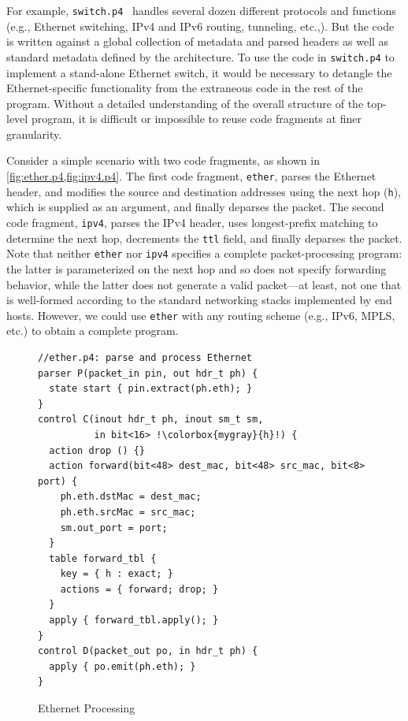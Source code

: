 \documentclass[letterpaper,twocolumn,10pt]{article}
\begin{document}
For example, \texttt{switch.p4}~\cite{switch.p4} handles several dozen
different protocols and functions (e.g., Ethernet switching, IPv4 and
IPv6 routing, tunneling, etc.,). But the code is written against a
global collection of metadata and parsed headers as well as standard
metadata defined by the architecture. To use the code in
\texttt{switch.p4} to implement a stand-alone Ethernet switch, it
would be necessary to detangle the Ethernet-specific functionality
from the extraneous code in the rest of the program. Without a
detailed understanding of the overall structure of the top-level
program, it is difficult or impossible to reuse code fragments at
finer granularity.

Consider a simple scenario with two code fragments, as shown in
\cref{fig:ether.p4,fig:ipv4.p4}. The first code fragment,
\texttt{ether}, parses the Ethernet header, and modifies the source
and destination addresses using the next hop (\texttt{h}), which is
supplied as an argument, and finally deparses the packet. The second
code fragment, \texttt{ipv4}, parses the IPv4 header, uses
longest-prefix matching to determine the next hop, decrements the
\texttt{ttl} field, and finally deparses the packet. Note that neither
\texttt{ether} nor \texttt{ipv4} specifies a complete
packet-processing program: the latter is parameterized on the next hop
and so does not specify forwarding behavior, while the latter does not
generate a valid packet---at least, not one that is well-formed
according to the standard networking stacks implemented by end hosts.
However, we could use \texttt{ether} with any routing scheme (e.g.,
IPv6, MPLS, etc.) to obtain a complete program.

\begin{figure}[ht]
\begin{lstlisting}[frame=none, escapechar=!]
//ether.p4: parse and process Ethernet
parser P(packet_in pin, out hdr_t ph) {
  state start { pin.extract(ph.eth); }
}
control C(inout hdr_t ph, inout sm_t sm,
          in bit<16> !\colorbox{mygray}{h}!) {
  action drop () {}
  action forward(bit<48> dest_mac, bit<48> src_mac, bit<8> port) {
    ph.eth.dstMac = dest_mac;
    ph.eth.srcMac = src_mac;
    sm.out_port = port;
  }
  table forward_tbl {
    key = { h : exact; }
    actions = { forward; drop; }
  }
  apply { forward_tbl.apply(); }
}
control D(packet_out po, in hdr_t ph) {
  apply { po.emit(ph.eth); }
}
\end{lstlisting}
\caption{Ethernet Processing}
\label{fig:ether.p4}
\end{figure}
\end{document}
